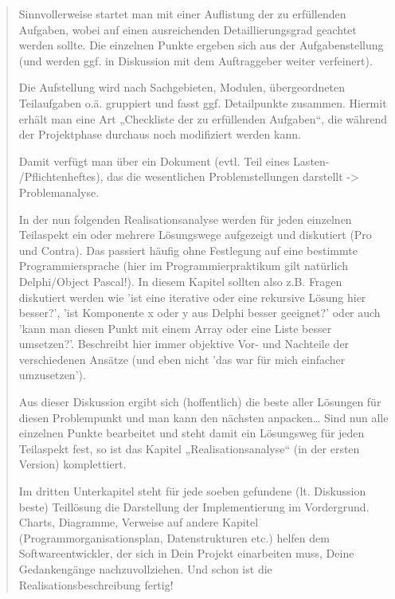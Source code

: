 \documentclass[12pt, letterpaper, twoside]{article}
\begin{document}
            \begin{verse}
                    \item Sinnvollerweise startet man mit einer Auflistung der zu erfüllenden Aufgaben, wobei auf einen ausreichenden Detaillierungsgrad geachtet werden sollte. Die einzelnen Punkte ergeben sich aus der Aufgabenstellung (und werden ggf. in Diskussion mit dem Auftraggeber weiter verfeinert).

                    \item Die Aufstellung wird nach Sachgebieten, Modulen, übergeordneten Teilaufgaben o.ä. gruppiert und fasst ggf. Detailpunkte zusammen. Hiermit erhält man eine Art „Checkliste der zu erfüllenden Aufgaben“, die während der Projektphase durchaus noch modifiziert werden kann.

                    \item Damit verfügt man über ein Dokument (evtl. Teil eines Lasten- /Pflichtenheftes), das die wesentlichen Problemstellungen darstellt -> Problemanalyse.

                    \item In der nun folgenden Realisationsanalyse werden für jeden einzelnen Teilaspekt ein oder mehrere Lösungswege aufgezeigt und diskutiert (Pro und Contra). Das passiert häufig ohne Festlegung auf eine bestimmte Programmiersprache (hier im Programmierpraktikum gilt natürlich Delphi/Object Pascal!). In diesem Kapitel sollten also z.B. Fragen diskutiert werden wie 'ist eine iterative oder eine rekursive Lösung hier besser?', 'ist Komponente x oder y aus Delphi besser geeignet?' oder auch 'kann man diesen Punkt mit einem Array oder eine Liste besser umsetzen?'. Beschreibt hier immer objektive Vor- und Nachteile der verschiedenen Ansätze (und eben nicht 'das war für mich einfacher umzusetzen').

                    \item Aus dieser Diskussion ergibt sich (hoffentlich) die beste aller Lösungen für diesen Problempunkt und man kann den nächsten anpacken… Sind nun alle einzelnen Punkte bearbeitet und steht damit ein Lösungsweg für jeden Teilaspekt fest, so ist das Kapitel „Realisationsanalyse“ (in der ersten Version) komplettiert.

                    \item Im dritten Unterkapitel steht für jede soeben gefundene (lt. Diskussion beste) Teillösung die Darstellung der Implementierung im Vordergrund. Charts, Diagramme, Verweise auf andere Kapitel (Programmorganisationsplan, Datenstrukturen etc.) helfen dem Softwareentwickler, der sich in Dein Projekt einarbeiten muss, Deine Gedankengänge nachzuvollziehen. Und schon ist die Realisationsbeschreibung fertig!


\end{verse}
\end{document}
